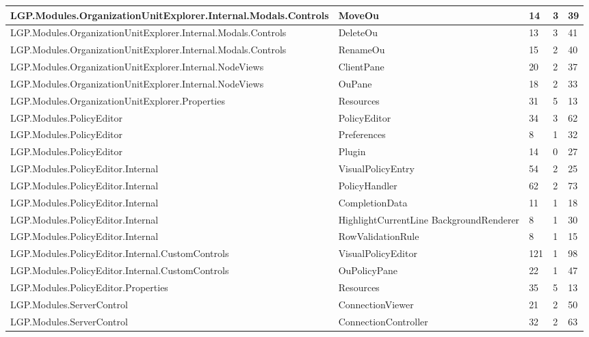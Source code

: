 \begin{table}[h!t]
{\begin{tabular}{ | p{82mm} | p{32mm} | p{10mm} | p{10mm} | p{10mm} | }
				LGP.Modules.OrganizationUnitExplorer.Internal.Modals.Controls & MoveOu & 14    & 3     & 39  \\ \hline
				LGP.Modules.OrganizationUnitExplorer.Internal.Modals.Controls & DeleteOu & 13    & 3     & 41  \\ \hline
				LGP.Modules.OrganizationUnitExplorer.Internal.Modals.Controls & RenameOu & 15    & 2     & 40  \\ \hline
				LGP.Modules.OrganizationUnitExplorer.Internal.NodeViews & ClientPane & 20    & 2     & 37  \\ \hline
				LGP.Modules.OrganizationUnitExplorer.Internal.NodeViews & OuPane & 18    & 2     & 33  \\ \hline
				LGP.Modules.OrganizationUnitExplorer.Properties & Resources & 31    & 5     & 13  \\ \hline
				LGP.Modules.PolicyEditor & PolicyEditor & 34    & 3     & \cellcolor{ored}62  \\ \hline
				LGP.Modules.PolicyEditor & Preferences & 8     & 1     & 32  \\ \hline
				LGP.Modules.PolicyEditor & Plugin & 14    & 0     & 27  \\ \hline
				LGP.Modules.PolicyEditor.Internal & VisualPolicyEntry & \cellcolor{ored}54    & 2     & 25  \\ \hline
				LGP.Modules.PolicyEditor.Internal & PolicyHandler & \cellcolor{ored}62    & 2     & \cellcolor{ored}73  \\ \hline
				LGP.Modules.PolicyEditor.Internal & CompletionData & 11    & 1     & 18  \\ \hline
				LGP.Modules.PolicyEditor.Internal & HighlightCurrentLine\newline
													BackgroundRenderer & 8     & 1     & 30  \\ \hline
				LGP.Modules.PolicyEditor.Internal & RowValidationRule & 8     & 1     & 15  \\ \hline
				LGP.Modules.PolicyEditor.Internal.CustomControls & VisualPolicyEditor & \cellcolor{ored}121   & 1     & \cellcolor{ored}98  \\ \hline
				LGP.Modules.PolicyEditor.Internal.CustomControls & OuPolicyPane & 22    & 1     & \cellcolor{ored}47  \\ \hline
				LGP.Modules.PolicyEditor.Properties & Resources & 35    & 5     & 13  \\ \hline
				LGP.Modules.ServerControl & ConnectionViewer & 21    & 2     & \cellcolor{ored}50  \\ \hline
				LGP.Modules.ServerControl & ConnectionController & 32    & 2     & \cellcolor{ored}63  \\ \hline

\end{tabular}}
\end{table}
